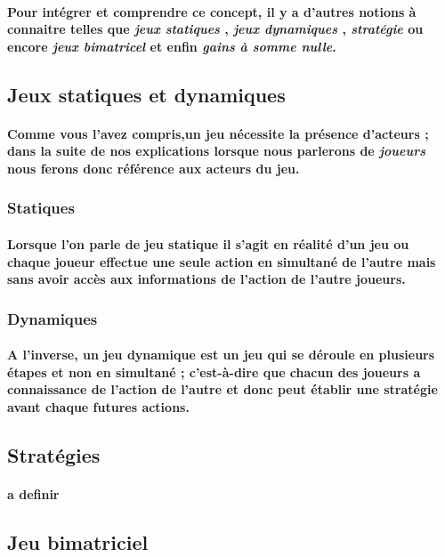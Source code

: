 \documentclass[a4paper, 12pt, twoside]{article}
\begin{document}
\paragraph{Pour intégrer et comprendre ce concept, il y a d'autres notions à connaitre telles que \textit{jeux statiques} , \textit{jeux dynamiques} , \textit{stratégie } ou encore \textit{jeux bimatricel} et enfin \textit{gains à somme nulle}.}
	
\subsection{Jeux statiques et dynamiques}
\paragraph{Comme vous l'avez compris,un jeu nécessite la présence d'acteurs ; dans la suite de nos explications lorsque nous parlerons de \textit{joueurs} nous ferons donc référence aux acteurs du jeu.}
\subsubsection{Statiques}
\paragraph{Lorsque l'on parle de jeu statique il s'agit en réalité d'un jeu ou chaque joueur effectue une seule action en simultané de l'autre mais sans avoir accès aux informations de l'action de l'autre joueurs.}
\subsubsection{Dynamiques}
\paragraph{A l'inverse, un jeu dynamique est un jeu qui se déroule en plusieurs étapes et non en simultané ; c'est-à-dire que chacun des joueurs a connaissance de l'action de l'autre et donc peut établir une stratégie avant chaque futures actions.  }
\subsection{Stratégies}
\paragraph{a definir}
\subsection{Jeu bimatriciel}
\end{document}
